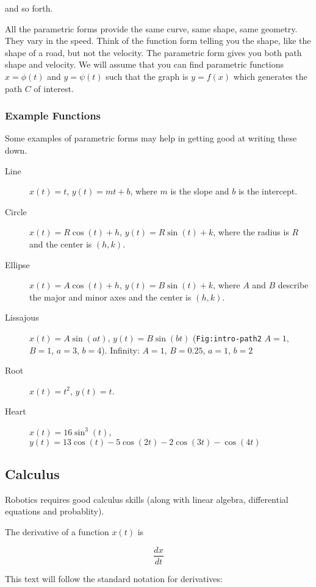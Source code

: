 and so forth.

All the parametric forms provide the same curve, same shape, same
geometry. They vary in the speed. Think of the function form telling you
the shape, like the shape of a road, but not the velocity. The
parametric form gives you both path shape and velocity. We will assume
that you can find parametric functions \(x = \phi(t)\) and
\(y = \psi(t)\) such that the graph is \(y=f(x)\) which generates the
path \(C\) of interest.

\hypertarget{example-functions}{%
\subsubsection{Example Functions}\label{example-functions}}

Some examples of parametric forms may help in getting good at writing
these down.

\begin{description}
\item[Line]
\(x(t) = t\), \(y(t) = mt + b\), where \(m\) is the slope and \(b\) is
the intercept.
\item[Circle]
\(x(t) = R \cos(t) + h\), \(y(t) = R \sin(t) + k\), where the radius is
\(R\) and the center is \((h,k)\).
\item[Ellipse]
\(x(t) = A \cos(t) + h\), \(y(t) = B \sin(t) + k\), where \(A\) and
\(B\) describe the major and minor axes and the center is \((h,k)\).
\item[Lissajous]
\(x(t) = A\sin(at)\), \(y(t) = B \sin(bt)\) (\texttt{Fig:intro-path2}
\(A=1\), \(B=1\), \(a=3\), \(b=4\)). Infinity: \(A=1\), \(B=0.25\),
\(a=1\), \(b=2\)
\item[Root]
\(x(t) =  t^2\), \(y(t) = t\).
\item[Heart]
\(x(t) = 16\sin^3(t)\),
\(y(t) = 13\cos(t) - 5\cos(2t) -2\cos(3t) - \cos(4t)\)
\end{description}

\hypertarget{calculus}{%
\subsection{Calculus}\label{calculus}}

Robotics requires good calculus skills (along with linear algebra,
differential equations and probablity).

The derivative of a function \(x(t)\) is

\[\displaystyle \frac{dx}{dt}\]

This text will follow the standard notation for derivatives:

